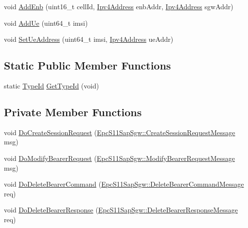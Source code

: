 \begin{DoxyCompactItemize}
\item 
void \hyperlink{classns3_1_1EpcSgwPgwApplication_af59a96aed58de1ac0adefe13ec6a3fa4}{Add\+Enb} (uint16\+\_\+t cell\+Id, \hyperlink{classns3_1_1Ipv4Address}{Ipv4\+Address} enb\+Addr, \hyperlink{classns3_1_1Ipv4Address}{Ipv4\+Address} sgw\+Addr)
\item 
void \hyperlink{classns3_1_1EpcSgwPgwApplication_adce905cafa429fbd0625c6018b68abd6}{Add\+Ue} (uint64\+\_\+t imsi)
\item 
void \hyperlink{classns3_1_1EpcSgwPgwApplication_aef71dc53ba3d67850a5e98810a6f2961}{Set\+Ue\+Address} (uint64\+\_\+t imsi, \hyperlink{classns3_1_1Ipv4Address}{Ipv4\+Address} ue\+Addr)
\end{DoxyCompactItemize}
\subsection*{Static Public Member Functions}
\begin{DoxyCompactItemize}
\item 
static \hyperlink{classns3_1_1TypeId}{Type\+Id} \hyperlink{classns3_1_1EpcSgwPgwApplication_a2cf6a61dcdb46991e2a19cf44626f2e9}{Get\+Type\+Id} (void)
\end{DoxyCompactItemize}
\subsection*{Private Member Functions}
\begin{DoxyCompactItemize}
\item 
void \hyperlink{classns3_1_1EpcSgwPgwApplication_a994ec0a8365d89b589bf2ed4d2051e2d}{Do\+Create\+Session\+Request} (\hyperlink{structns3_1_1EpcS11SapSgw_1_1CreateSessionRequestMessage}{Epc\+S11\+Sap\+Sgw\+::\+Create\+Session\+Request\+Message} msg)
\item 
void \hyperlink{classns3_1_1EpcSgwPgwApplication_a90fb12acb1c198b0bb13196c9f620f8b}{Do\+Modify\+Bearer\+Request} (\hyperlink{structns3_1_1EpcS11SapSgw_1_1ModifyBearerRequestMessage}{Epc\+S11\+Sap\+Sgw\+::\+Modify\+Bearer\+Request\+Message} msg)
\item 
void \hyperlink{classns3_1_1EpcSgwPgwApplication_a4eb98a93b6353fb24f0d821ecc1055a2}{Do\+Delete\+Bearer\+Command} (\hyperlink{structns3_1_1EpcS11SapSgw_1_1DeleteBearerCommandMessage}{Epc\+S11\+Sap\+Sgw\+::\+Delete\+Bearer\+Command\+Message} req)
\item 
void \hyperlink{classns3_1_1EpcSgwPgwApplication_a8e8dde46ca31002ef4da8cae64140e68}{Do\+Delete\+Bearer\+Response} (\hyperlink{structns3_1_1EpcS11SapSgw_1_1DeleteBearerResponseMessage}{Epc\+S11\+Sap\+Sgw\+::\+Delete\+Bearer\+Response\+Message} req)
\end{DoxyCompactItemize}
